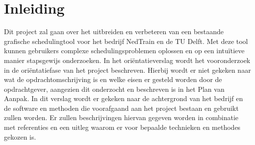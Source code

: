 \section{Inleiding}
Dit project zal gaan over het uitbreiden en verbeteren van een bestaande grafische schedulingtool voor het bedrijf NedTrain en de TU Delft. Met deze tool kunnen gebruikers complexe schedulingsproblemen oplossen en op een intu\"itieve manier stapsgewijs onderzoeken. In het ori\"entatieverslag wordt het vooronderzoek in de ori\"entatiefase van het project beschreven. Hierbij wordt er niet gekeken naar wat de opdrachtomschrijving is en welke eisen er gesteld worden door de opdrachtgever, aangezien dit onderzocht en beschreven is in het Plan van Aanpak. In dit verslag wordt er gekeken naar de achtergrond van het bedrijf en de software en methoden die voorafgaand aan het project bestaan en gebruikt zullen worden. Er zullen beschrijvingen hiervan gegeven worden in combinatie met referenties en een uitleg waarom er voor bepaalde technieken en methodes gekozen is.
